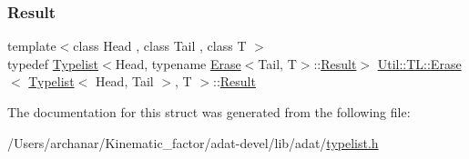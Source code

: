 \subsubsection{\texorpdfstring{Result}{Result}\hspace{0.1cm}{\footnotesize\ttfamily [3/3]}}
{\footnotesize\ttfamily template$<$class Head , class Tail , class T $>$ \\
typedef \mbox{\hyperlink{structUtil_1_1Typelist}{Typelist}}$<$Head, typename \mbox{\hyperlink{structUtil_1_1TL_1_1Erase}{Erase}}$<$Tail, T$>$\+::\mbox{\hyperlink{structUtil_1_1TL_1_1Erase_3_01Typelist_3_01Head_00_01Tail_01_4_00_01T_01_4_a68b3e32a3703ec33f196f25e84e3841e}{Result}}$>$ \mbox{\hyperlink{structUtil_1_1TL_1_1Erase}{Util\+::\+T\+L\+::\+Erase}}$<$ \mbox{\hyperlink{structUtil_1_1Typelist}{Typelist}}$<$ Head, Tail $>$, T $>$\+::\mbox{\hyperlink{structUtil_1_1TL_1_1Erase_3_01Typelist_3_01Head_00_01Tail_01_4_00_01T_01_4_a68b3e32a3703ec33f196f25e84e3841e}{Result}}}



The documentation for this struct was generated from the following file\+:\begin{DoxyCompactItemize}
\item 
/\+Users/archanar/\+Kinematic\+\_\+factor/adat-\/devel/lib/adat/\mbox{\hyperlink{adat-devel_2lib_2adat_2typelist_8h}{typelist.\+h}}\end{DoxyCompactItemize}
